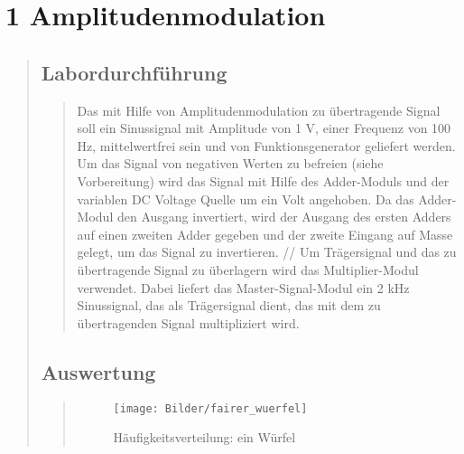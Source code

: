 \section{1 Amplitudenmodulation}
\begin{quote}
    
    
    \subsection{Labordurchführung}
    \begin{quote}
      Das mit Hilfe von Amplitudenmodulation zu übertragende Signal soll ein
      Sinussignal mit Amplitude von 1 V, einer Frequenz von 100 Hz, 
      mittelwertfrei sein und von Funktionsgenerator geliefert werden.
      Um das Signal von negativen Werten zu befreien (siehe Vorbereitung) wird
      das Signal mit Hilfe des Adder-Moduls und der variablen DC Voltage Quelle
      um ein Volt angehoben. Da das Adder-Modul den Ausgang invertiert, wird der
      Ausgang des ersten Adders auf einen zweiten Adder gegeben und der zweite
      Eingang auf Masse gelegt, um das Signal zu invertieren. //
      Um Trägersignal und das zu übertragende Signal zu überlagern wird das
      Multiplier-Modul verwendet. Dabei liefert das Master-Signal-Modul ein 2
      kHz Sinussignal, das als Trägersignal dient, das mit dem zu übertragenden
      Signal multipliziert wird.
        
    \end{quote}
    
    
    
    
    
    \subsection{Auswertung}
    \begin{quote}
        
        
        \hspace{-5cm}
            \begin{minipage}{0.6\textwidth}
                
                \begin{figure}[H]
                    \label{fig:funktion0alpha}
                    \texttt{[image: Bilder/fairer\_wuerfel]}
                    \caption{Häufigkeitsverteilung: ein Würfel}
                \end{figure}
        
            \end{minipage}
        

\end{quote}
\end{quote}
